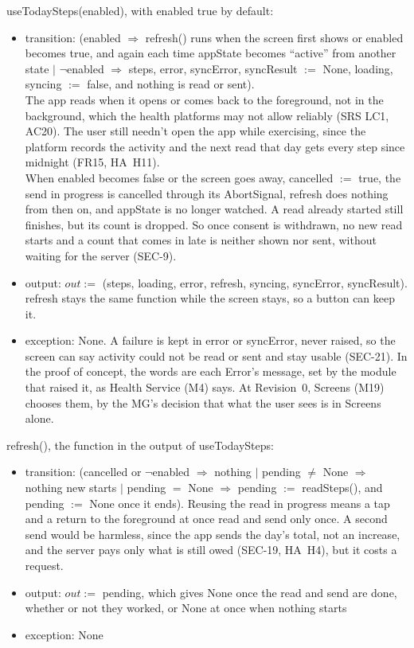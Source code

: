 \documentclass[12pt, titlepage]{article}
\begin{document}
\noindent useTodaySteps(enabled), with enabled true by default:
\begin{itemize}
\item transition: (enabled $\Rightarrow$ refresh() runs when the screen first
  shows or enabled becomes true, and again each time appState becomes
  ``active'' from another state
  $|$ $\neg$enabled $\Rightarrow$ steps, error, syncError, syncResult $:=$ None,
  loading, syncing $:=$ false, and nothing is read or sent).\\
  The app reads when it opens or comes back to the foreground, not in the
  background, which the health platforms may not allow reliably (SRS LC1,
  AC20). The user still needn't open the app while exercising, since the
  platform records the activity and the next read that day gets every step
  since midnight (FR15, HA~H11).\\
  When enabled becomes false or the screen goes away, cancelled $:=$ true, the
  send in progress is cancelled through its AbortSignal, refresh does nothing
  from then on, and appState is no longer watched. A read already started
  still finishes, but its count is dropped. So once consent is withdrawn, no
  new read starts and a count that comes in late is neither shown nor sent,
  without waiting for the server (SEC-9).
\item output: $out :=$ (steps, loading, error, refresh, syncing, syncError,
  syncResult). refresh stays the same function while the screen stays, so a
  button can keep it.
\item exception: None. A failure is kept in error or syncError, never raised,
  so the screen can say activity could not be read or sent and stay usable
  (SEC-21). In the proof of concept, the words are each Error's message, set
  by the module that raised it, as Health Service (M4) says. At Revision~0,
  Screens (M19) chooses them, by the MG's decision that what the user sees is
  in Screens alone.
\end{itemize}

\noindent refresh(), the function in the output of useTodaySteps:
\begin{itemize}
\item transition: (cancelled or $\neg$enabled $\Rightarrow$ nothing $|$
  pending $\neq$ None $\Rightarrow$ nothing new starts $|$ pending $=$ None
  $\Rightarrow$ pending $:=$ readSteps(), and pending $:=$ None once it ends).
  Reusing the read in progress means a tap and a return to the foreground at
  once read and send only once. A second send would be harmless, since the app
  sends the day's total, not an increase, and the server pays only what is
  still owed (SEC-19, HA~H4), but it costs a request.
\item output: $out :=$ pending, which gives None once the read and send are
  done, whether or not they worked, or None at once when nothing starts
\item exception: None
\end{itemize}
\end{document}
